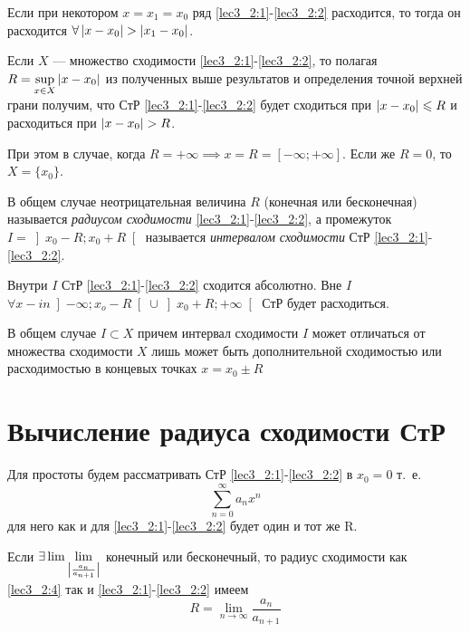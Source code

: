 \documentclass[../../main.tex]{subfiles}
\begin{document}
\begin{crl*}
	Если при некотором $x=x_1=x_0$ ряд \eqref{lec3_2:1}-\eqref{lec3_2:2}
	 расходится, то тогда он расходится $\forall \left|{x-x_0}\right| > \left|{x_1-x_0}\right|$.
\end{crl*}	
\begin{rem}
	Если $X$ --- множество сходимости \eqref{lec3_2:1}-\eqref{lec3_2:2}, 
	то полагая $R=\underset{x\in X}{\sup} \left|{x-x_0}\right|$ из полученных выше 
	результатов и определения точной верхней грани получим, 
	что СтР \eqref{lec3_2:1}-\eqref{lec3_2:2}
	будет сходиться при $\left|{x-x_0}\right|\leqslant R$ и расходиться при $\abs{x-x_0}>R$.
	
	При этом в случае, когда $R=+\infty \implies 
	x=R=\left[-\infty;+\infty\right]$.
	Если же $R=0$, то $X=\{x_0\}$.	
\end{rem}	
В общем  случае неотрицательная величина $R$ (конечная или бесконечная) 
называется \emph{радиусом сходимости}  \eqref{lec3_2:1}-\eqref{lec3_2:2}, а 
промежуток $I=\left]x_0-R;x_0+R\right[$ называется 
\emph{интервалом сходимости} 
СтР \eqref{lec3_2:1}-\eqref{lec3_2:2}.
	
Внутри $I$ СтР \eqref{lec3_2:1}-\eqref{lec3_2:2} сходится абсолютно. Вне $I$
$\forall x-in\left]-\infty;x_o-R\right[\cup\left]x_0+R;+\infty\right[$
СтР будет расходиться.
	 
В общем случае $I\subset X$ причем интервал сходимости $I$ может
отличаться от множества сходимости $X$ лишь может быть дополнительной 
сходимостью или расходимостью в концевых точках $x=x_0\pm R$
	 
\section{Вычисление радиуса сходимости СтР}
	
Для простоты будем рассматривать СтР \eqref{lec3_2:1}-\eqref{lec3_2:2} в $x_0=0$
т.~е. 
\begin{equation}\label{lec3_2:4}
	\sum_{n=0}^{\infty}a_nx^n
\end{equation}
для него как и для \eqref{lec3_2:1}-\eqref{lec3_2:2} будет один и тот же
R.
\begin{thm}
	Если $\exists \lim\lim\limits_{\left|{\frac{a_n}{a_{n+1}}}\right|}$ конечный или 
	бесконечный, то радиус сходимости как \eqref{lec3_2:4} так и 
	\eqref{lec3_2:1}-\eqref{lec3_2:2} имеем
	\begin{equation}
		R=\lim\limits_{n\rightarrow\infty}\frac{a_n}{a_{n+1}}
		\label{lec3_2:5}
	\end{equation}
\end{thm}	
\end{document}
